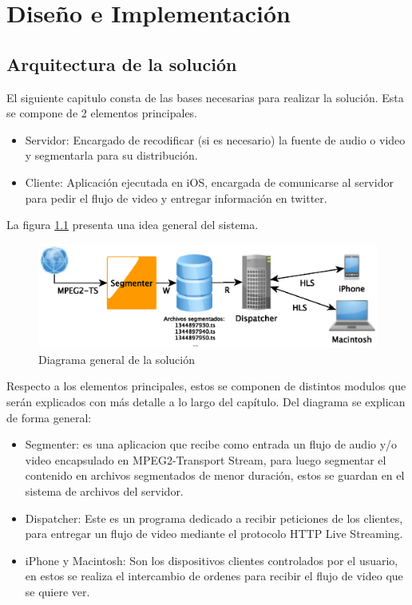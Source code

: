 \chapter{Diseño e Implementación}
\section{Arquitectura de la solución}
El siguiente capitulo consta de las bases necesarias para realizar la solución. Esta se compone de 2 elementos principales. 
\begin{itemize}
\item Servidor: Encargado de recodificar (si es necesario) la fuente de audio o video y segmentarla para su distribución.
\item Cliente: Aplicación ejecutada en iOS, encargada de comunicarse al servidor para pedir el flujo de video y entregar información en twitter.
\end{itemize}
La figura \ref{diagramaGral} presenta una idea general del sistema.\\

\begin{figure}[h!]
	\centering
	\includegraphics[scale=0.8]{imgs/diagrama_general.eps}
	\caption{Diagrama general de la solución}
	\label{diagramaGral}	
\end{figure}

Respecto a los elementos principales, estos se componen de distintos modulos que serán explicados con más detalle a lo largo del capítulo. Del diagrama se explican de forma general:
\begin{itemize}
\item Segmenter: es una aplicacion que recibe como entrada un flujo de audio y/o video encapsulado en MPEG2-Transport Stream, para luego segmentar el contenido en archivos segmentados de menor duración, estos se guardan en el sistema de archivos del servidor.
\item Dispatcher: Este es un programa dedicado a recibir peticiones de los clientes, para entregar un flujo de video mediante el protocolo HTTP Live Streaming.
\item iPhone y Macintosh: Son los dispositivos clientes controlados por el usuario, en estos se realiza el intercambio de ordenes para recibir el flujo de video que se quiere ver.
\end{itemize}


